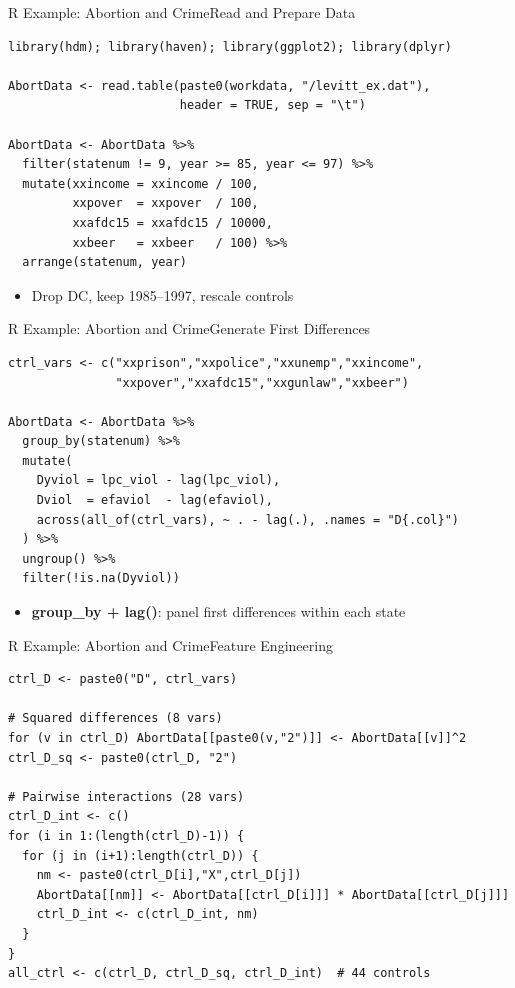\documentclass[hyperref={pdfpagelabels=false}]{beamer}
\begin{document}
\begin{frame}[fragile]{R Example: Abortion and Crime}{Read and Prepare Data}
\begin{lstlisting}
library(hdm); library(haven); library(ggplot2); library(dplyr)

AbortData <- read.table(paste0(workdata, "/levitt_ex.dat"),
                        header = TRUE, sep = "\t")

AbortData <- AbortData %>%
  filter(statenum != 9, year >= 85, year <= 97) %>%
  mutate(xxincome = xxincome / 100,
         xxpover  = xxpover  / 100,
         xxafdc15 = xxafdc15 / 10000,
         xxbeer   = xxbeer   / 100) %>%
  arrange(statenum, year)
\end{lstlisting}
\begin{itemize}
	\item Drop DC, keep 1985--1997, rescale controls
\end{itemize}
\end{frame}



\begin{frame}[fragile]{R Example: Abortion and Crime}{Generate First Differences}
\begin{lstlisting}
ctrl_vars <- c("xxprison","xxpolice","xxunemp","xxincome",
               "xxpover","xxafdc15","xxgunlaw","xxbeer")

AbortData <- AbortData %>%
  group_by(statenum) %>%
  mutate(
    Dyviol = lpc_viol - lag(lpc_viol),
    Dviol  = efaviol  - lag(efaviol),
    across(all_of(ctrl_vars), ~ . - lag(.), .names = "D{.col}")
  ) %>%
  ungroup() %>%
  filter(!is.na(Dyviol))
\end{lstlisting}
\begin{itemize}
	\item \textbf{group\_by + lag()}: panel first differences within each state
\end{itemize}
\end{frame}



\begin{frame}[fragile]{R Example: Abortion and Crime}{Feature Engineering}
\begin{lstlisting}
ctrl_D <- paste0("D", ctrl_vars)

# Squared differences (8 vars)
for (v in ctrl_D) AbortData[[paste0(v,"2")]] <- AbortData[[v]]^2
ctrl_D_sq <- paste0(ctrl_D, "2")

# Pairwise interactions (28 vars)
ctrl_D_int <- c()
for (i in 1:(length(ctrl_D)-1)) {
  for (j in (i+1):length(ctrl_D)) {
    nm <- paste0(ctrl_D[i],"X",ctrl_D[j])
    AbortData[[nm]] <- AbortData[[ctrl_D[i]]] * AbortData[[ctrl_D[j]]]
    ctrl_D_int <- c(ctrl_D_int, nm)
  }
}
all_ctrl <- c(ctrl_D, ctrl_D_sq, ctrl_D_int)  # 44 controls
\end{lstlisting}
\end{frame}
\end{document}
